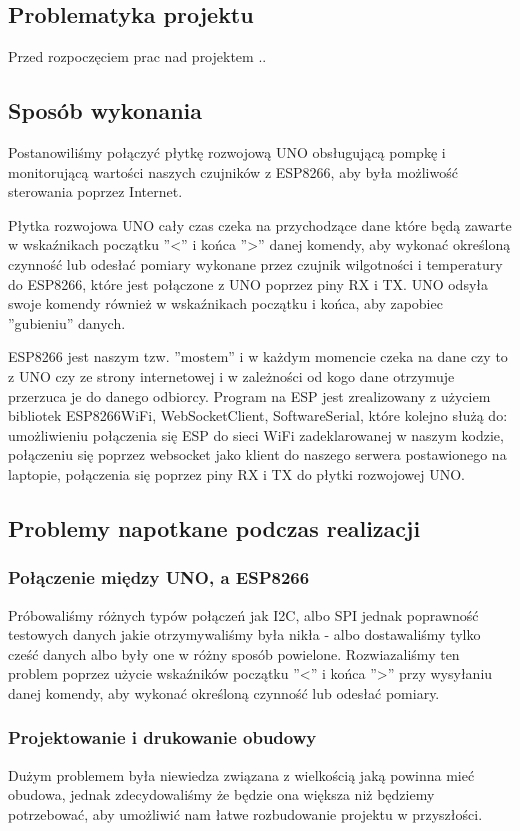 \documentclass[12pt]{article}
\begin{document}
\subsection{Problematyka projektu}
Przed rozpoczęciem prac nad projektem .. 

\subsection{Sposób wykonania}
Postanowiliśmy połączyć płytkę rozwojową UNO obsługującą pompkę i monitorującą wartości naszych czujników z ESP8266, aby była możliwość sterowania poprzez Internet.

Płytka rozwojowa UNO cały czas czeka na przychodzące dane które będą zawarte w wskaźnikach początku ''<'' i końca ''>'' danej komendy, aby wykonać określoną czynność lub odesłać pomiary wykonane przez czujnik wilgotności i temperatury do ESP8266, które jest połączone z UNO poprzez piny RX i TX. UNO odsyła swoje komendy również w wskaźnikach początku i końca, aby zapobiec ''gubieniu'' danych.

ESP8266 jest naszym tzw. ''mostem'' i w każdym momencie czeka na dane czy to z UNO czy ze strony internetowej i w zależności od kogo dane otrzymuje przerzuca je do danego odbiorcy.
Program na ESP jest zrealizowany z użyciem bibliotek ESP8266WiFi, WebSocketClient, SoftwareSerial, które kolejno służą do: umożliwieniu połączenia się ESP do sieci WiFi zadeklarowanej w naszym kodzie, połączeniu się poprzez websocket jako klient do naszego serwera postawionego na laptopie, połączenia się poprzez piny RX i TX do płytki rozwojowej UNO.

\subsection{Problemy napotkane podczas realizacji}
\subsubsection{Połączenie między UNO, a ESP8266}
Próbowaliśmy różnych typów połączeń jak I2C, albo SPI jednak poprawność testowych danych jakie otrzymywaliśmy była nikła - albo dostawaliśmy tylko cześć danych albo były one w różny sposób powielone.
Rozwiazaliśmy ten problem poprzez użycie wskaźników początku ''<'' i końca ''>'' przy wysyłaniu danej komendy, aby wykonać określoną czynność lub odesłać pomiary. 
\subsubsection{Projektowanie i drukowanie obudowy}
Dużym problemem była niewiedza związana z wielkością jaką powinna mieć obudowa, jednak zdecydowaliśmy że będzie ona większa niż będziemy potrzebować, aby umożliwić nam łatwe rozbudowanie projektu w przyszłości. 
\end{document}
